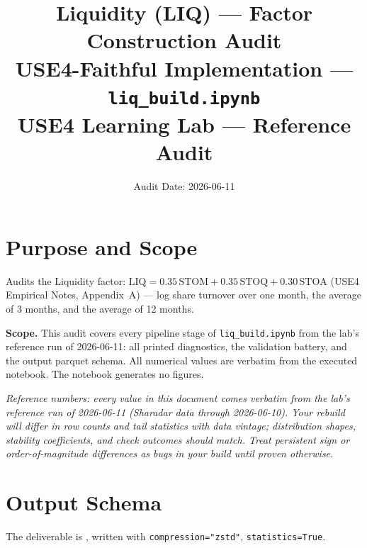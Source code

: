 \documentclass[11pt,a4paper]{article}
\title{\textbf{Liquidity (LIQ) --- Factor Construction Audit}\\[2pt]
\large USE4-Faithful Implementation --- \texttt{liq\_build.ipynb}\\[4pt]
\normalsize USE4 Learning Lab --- Reference Audit}
\author{Audit Date: 2026-06-11}
\date{}
\newcommand{\NOTE}[1]{\textcolor{note}{\textit{#1}}}
\begin{document}
\maketitle
\tableofcontents
\newpage

\section{Purpose and Scope}

Audits the Liquidity factor:
$\mathrm{LIQ} = 0.35\,\mathrm{STOM} + 0.35\,\mathrm{STOQ} + 0.30\,\mathrm{STOA}$
(USE4 Empirical Notes, Appendix~A) --- log share turnover over one month, the
average of 3 months, and the average of 12 months.

\smallskip
\textbf{Scope.} This audit covers every pipeline stage of
\texttt{liq\_build.ipynb} from the lab's reference run of 2026-06-11: all printed diagnostics, the
validation battery, and the output parquet schema. All numerical values are
verbatim from the executed notebook. The notebook generates no figures.

\NOTE{Reference numbers: every value in this document comes verbatim from the lab's reference run of 2026-06-11 (Sharadar data through 2026-06-10). Your rebuild will differ in row counts and tail statistics with data vintage; distribution shapes, stability coefficients, and check outcomes should match. Treat persistent sign or order-of-magnitude differences as bugs in your build until proven otherwise.}


\section{Output Schema}

The deliverable is , written with
\texttt{compression="zstd"}, \newline\texttt{statistics=True}.
\end{document}
